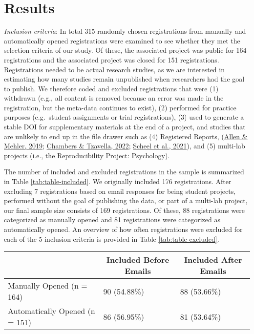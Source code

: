 \documentclass[
  ,jou, a4paper,floatsintext]{apa6}
\begin{document}
\hypertarget{results}{%
\section{Results}\label{results}}

\emph{Inclusion criteria}: In total 315 randomly chosen registrations from manually and automatically opened registrations were examined to see whether they met the selection criteria of our study. Of these, the associated project was public for 164 registrations and the associated project was closed for 151 registrations. Registrations needed to be actual research studies, as we are interested in estimating how many studies remain unpublished when researchers had the goal to publish. We therefore coded and excluded registrations that were (1) withdrawn (e.g., all content is removed because an error was made in the registration, but the meta-data continues to exist), (2) performed for practice purposes (e.g.~student assignments or trial registrations), (3) used to generate a stable DOI for supplementary materials at the end of a project, and studies that are unlikely to end up in the file drawer such as (4) Registered Reports, (\protect\hyperlink{ref-allen_open_2019}{Allen \& Mehler, 2019}; \protect\hyperlink{ref-chambers_past_2022}{Chambers \& Tzavella, 2022}; \protect\hyperlink{ref-scheel_excess_2021}{Scheel et al., 2021}), and (5) multi-lab projects (i.e., the Reproducibility Project: Psychology).

The number of included and excluded registrations in the sample is summarized in Table \ref{tab:table-included}. We originally included 176 registrations. After excluding 7 registrations based on email responses for being student projects, performed without the goal of publishing the data, or part of a multi-lab project, our final sample size consists of 169 registrations. Of these, 88 registrations were categorized as manually opened and 81 registrations were categorized as automatically opened. An overview of how often registrations were excluded for each of the 5 inclusion criteria is provided in Table \ref{tab:table-excluded}.

\begin{table*}[tbp]

\begin{center}
\begin{threeparttable}

\caption{\label{tab:table-included}Studies included in the analysis before and after e-mailing researchers.}

\begin{tabular}{lll}
\toprule
 & \multicolumn{1}{c}{Included Before Emails} & \multicolumn{1}{c}{Included After Emails}\\
\midrule
Manually Opened (n = 164) & 90 (54.88\%) & 88 (53.66\%)\\
Automatically Opened (n = 151) & 86 (56.95\%) & 81 (53.64\%)\\
\bottomrule
\end{tabular}

\end{threeparttable}
\end{center}

\end{table*}
\end{document}
